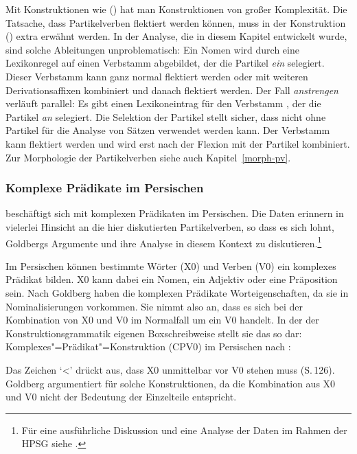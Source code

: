 Mit Konstruktionen wie () hat man Konstruktionen von großer Komplexität.
Die Tatsache, dass Partikelverben flektiert werden können, muss in der Konstruktion
() extra erwähnt werden. In der Analyse, die in diesem Kapitel entwickelt
wurde, sind solche Ableitungen unproblematisch: Ein Nomen wird durch eine
Lexikonregel auf einen Verbstamm abgebildet, der die Partikel \emph{ein} selegiert.
Dieser Verbstamm kann ganz normal flektiert werden oder mit weiteren Derivationsaffixen
kombiniert und danach flektiert werden. Der Fall \emph{anstrengen} verläuft parallel:
Es gibt einen Lexikoneintrag für den Verbstamm , der die Partikel \emph{an}
selegiert. Die Selektion der Partikel stellt sicher, dass  nicht ohne Partikel für die
Analyse von Sätzen verwendet werden kann. Der Verbstamm kann flektiert werden
und wird erst nach der Flexion mit der Partikel kombiniert.
Zur Morphologie der Partikelverben siehe auch Kapitel~\ref{morph-pv}.
\indexlfgend%
%
%
\largerpage

\subsubsection{Komplexe Prädikate im Persischen}
\label{sec-cp-persisch}

\citet{Goldberg2003a} beschäftigt sich mit komplexen Prädikaten im Persischen.
Die Daten erinnern in vielerlei Hinsicht an die hier diskutierten Partikelverben, so dass
es sich lohnt, Goldbergs Argumente und ihre Analyse in diesem Kontext zu diskutieren.\footnote{
  Für eine ausführliche Diskussion und eine Analyse der Daten im Rahmen der HPSG siehe .
}

Im Persischen können bestimmte Wörter (X0) und Verben (V0) ein komplexes Prädikat bilden.
X0 kann dabei ein Nomen, ein Adjektiv oder eine Präposition sein. Nach Goldberg haben die
komplexen Prädikate Worteigenschaften, da sie in Nominalisierungen vorkommen. Sie nimmt also an,
dass es sich bei der Kombination von X0 und V0 im Normalfall um ein V0 handelt. In der
der Konstruktionsgrammatik eigenen Boxschreibweise stellt sie das so dar:
\eas
Komplexes"=Prädikat"=Konstruktion (CPV0) im Persischen nach :\\
\zs
Das Zeichen `<' drückt aus, dass X0 unmittelbar vor V0 stehen muss (S.\,126). Goldberg argumentiert
für solche Konstruktionen, da die Kombination aus X0 und V0 nicht der Bedeutung der
Einzelteile entspricht.

